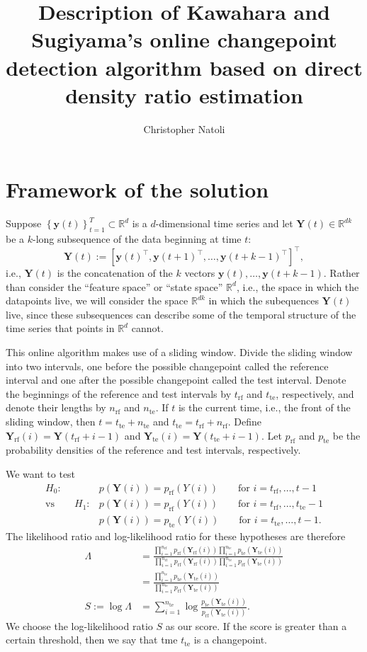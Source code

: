 \documentclass[12pt]{article}
\title{\normalsize\sc Description of Kawahara and Sugiyama's online changepoint detection algorithm based on direct density ratio estimation}
\author{\normalsize Christopher Natoli}
\date{}
\newcommand\bkt[1]{\left[ #1 \right]}
\newcommand\set[1]{\left\{ #1 \right\}}
\newcommand\RR{\mathbb{R}}
\newcommand\yy{\boldsymbol{y}}
\newcommand\YY{{\boldsymbol{Y}}}
\newcommand\rf{{\mathrm{rf}}}
\newcommand\te{{\mathrm{te}}}
\begin{document}
\maketitle

\section{Framework of the solution}

Suppose $\set{\yy(t)}_{t=1}^T\subset\RR^d$ is a $d$-dimensional time series and let $\YY(t)\in\RR^{dk}$ be a $k$-long subsequence of the data beginning at time $t$:
$$\YY(t):=\bkt{\yy(t)^\top, \yy(t+1)^\top, \ldots, \yy(t+k-1)^\top}^\top,$$
i.e., $\YY(t)$ is the concatenation of the $k$ vectors $\yy(t),\ldots,\yy(t+k-1)$. Rather than consider the ``feature space'' or ``state space'' $\RR^d$, i.e., the space in which the datapoints live, we will consider the space $\RR^{dk}$ in which the subequences $\YY(t)$ live, since these subsequences can describe some of the temporal structure of the time series that points in $\RR^d$ cannot.

This online algorithm makes use of a sliding window. Divide the sliding window into two intervals, one before the possible changepoint called the reference interval and one after the possible changepoint called the test interval. Denote the beginnings of the reference and test intervals by $t_\rf$ and $t_\te$, respectively, and denote their lengths by $n_\rf$ and $n_\te$. If $t$ is the current time, i.e., the front of the sliding window, then $t=t_\te+n_\te$ and $t_\te=t_\rf+n_\rf$. Define $\YY_\rf(i)=\YY(t_\rf+i-1)$ and $\YY_\te(i)=\YY(t_\te+i-1)$. Let $p_\rf$ and $p_\te$ be the probability densities of the reference and test intervals, respectively.

We want to test
\begin{align*}
  H_0\colon&p(\YY(i))=p_\rf(Y(i))\quad\quad\text{for $i=t_\rf,\ldots,t-1$}\\
  \text{vs}\quad\quad
  H_1\colon&p(\YY(i))=p_\rf(Y(i))\quad\quad\text{for $i=t_\rf,\ldots,t_\te-1$}\\
  &p(\YY(i))=p_\te(Y(i))\quad\quad\text{for $i=t_\te,\ldots,t-1$}.
\end{align*}
The likelihood ratio and log-likelihood ratio for these hypotheses are therefore
\begin{align*}
  \Lambda
  &=\frac{\prod_{i=1}^{n_\rf}p_\rf(\YY_\rf(i))\prod_{i=1}^{n_\te}p_\te(\YY_\te(i))}{\prod_{i=1}^{n_\rf}p_\rf(\YY_\rf(i))\prod_{i=1}^{n_\te}p_\rf(\YY_\te(i))}\\
  &=\frac{\prod_{i=1}^{n_\te}p_\te(\YY_\te(i))}{\prod_{i=1}^{n_\te}p_\rf(\YY_\te(i))}\\
  S:=\log\Lambda&=\sum_{i=1}^{n_\te}\log\frac{p_\te(\YY_\te(i))}{p_\rf(\YY_\te(i))}.
\end{align*}
We choose the log-likelihood ratio $S$ as our score. If the score is greater than a certain threshold, %
then we say that tme $t_\te$ is a changepoint.
\end{document}
